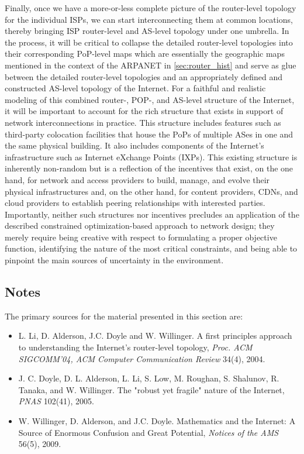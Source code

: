 Finally, once we have a more-or-less complete picture of the
router-level topology for the individual ISPs, we can start
interconnecting them at common locations, thereby bringing ISP
router-level and AS-level topology under one umbrella.  In the
process, it will be critical to collapse the detailed router-level
topologies into their corresponding PoP-level maps which are
essentially the geographic maps mentioned in the context of the
ARPANET in \autoref{sec:router_hist} and serve as glue between the
detailed router-level topologies and an appropriately defined and
constructed AS-level topology of the Internet.  For a faithful and
realistic modeling of this combined router-, POP-, and AS-level
structure of the Internet, it will be important to account for the
rich structure that exists in support of network interconnections in
practice.  This structure includes features such as third-party
colocation facilities that house the PoPs of multiple ASes in one and
the same physical building. It also includes components of the
Internet's infrastructure such as Internet eXchange Points (IXPs).
This existing structure is inherently non-random but is a reflection
of the incentives that exist, on the one hand, for network and access
providers to build, manage, and evolve their physical infrastructures
and, on the other hand, for content providers, CDNs, and cloud
providers to establish peering relationships with interested
parties. Importantly, neither such structures nor incentives precludes
an application of the described constrained optimization-based
approach to network design; they merely require being creative with
respect to formulating a proper objective function, identifying the
nature of the most critical constraints, and being able to pinpoint
the main sources of uncertainty in the environment.

\vspace{-2mm}
\subsection{Notes}
\vspace{-1mm}

The primary sources for the material presented in this section are:

\begin{itemize}

\item[\cite{Li04}] L. Li, D. Alderson, J.C. Doyle and W. Willinger.
A first principles approach to understanding the Internet's router-level topology, 
{\em Proc. ACM SIGCOMM'04, ACM Computer Communication Review} 34(4), 2004.

\item[\cite{Doyle05}] J. C. Doyle, D. L. Alderson, L. Li, S. Low, M. Roughan, S. Shalunov, 
R. Tanaka, and W. Willinger. 
The "robust yet fragile" nature of the Internet, 
{\em PNAS} 102(41), 2005.

\item[\cite{willinger09:_mathem_and_inter}] W. Willinger, D. Alderson, and J.C. Doyle. 
Mathematics and the Internet: A Source of Enormous Confusion and Great Potential, 
{\em Notices of the AMS} 56(5), 2009.

\end{itemize}


